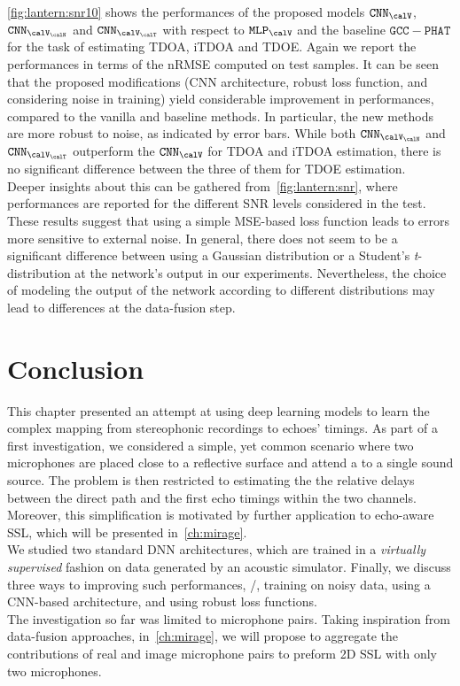 \noindent \cref{fig:lantern:snr10} shows the performances of the proposed models $\mathtt{CNN}_{\calV}$, $\mathtt{CNN}_{\calV_\calN}$ and $\mathtt{CNN}_{\calV_\calT}$
with respect to $\mathtt{MLP}_{\calV}$ and the baseline $\mathtt{GCC-PHAT}$ for the task of estimating \ac{TDOA}, \ac{iTDOA} and \ac{TDOE}.
Again we report the performances in terms of the \ac{nRMSE} computed on test samples.
It can be seen that the proposed modifications (\ac{CNN} architecture, robust loss function, and considering noise in training) yield considerable improvement in performances, compared to the vanilla and baseline methods.
In particular, the new methods are more robust to noise, as indicated by error bars.
While both $\mathtt{CNN}_{\calV_\calN}$ and $\mathtt{CNN}_{\calV_\calT}$ outperform the $\mathtt{CNN}_{\calV}$ for \ac{TDOA} and \ac{iTDOA} estimation, there is no significant difference between the three of them for \ac{TDOE} estimation.
\\Deeper insights about this can be gathered from~\cref{fig:lantern:snr}, where performances are reported for the different \ac{SNR} levels considered in the test.
These results suggest that using a simple \ac{MSE}-based loss function leads to errors more sensitive to external noise.
In general, there does not seem to be a significant difference between using a Gaussian distribution or a Student's \textit{t}-distribution at the network's output in our experiments.
Nevertheless, the choice of modeling the output of the network according to different distributions may lead to differences at the data-fusion step.

\section{Conclusion}\label{sec:lantern:conclusion}
This chapter presented an attempt at using deep learning models to learn the complex mapping from stereophonic recordings to echoes' timings.
As part of a first investigation, we considered a simple, yet common scenario where two microphones are placed close to a reflective surface and attend a to a single sound source.
The problem is then restricted to estimating the the relative delays between the direct path and the first echo timings within the two channels.
Moreover, this simplification is motivated by further application to echo-aware \ac{SSL}, which will be presented in~\cref{ch:mirage}.
\\We studied two standard \ac{DNN} architectures, which are trained in a \textit{virtually supervised} fashion on data generated by an acoustic simulator.
Finally, we discuss three ways to improving such performances, \ie/, training on noisy data, using a \ac{CNN}-based architecture, and using robust loss functions.
\\The investigation so far was limited to microphone pairs.
Taking inspiration from data-fusion approaches, in~\cref{ch:mirage}, we will propose to aggregate the contributions of real and image microphone pairs to preform 2D \ac{SSL} with only two microphones.

